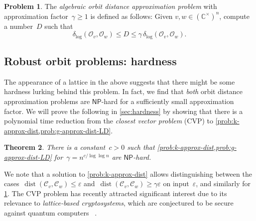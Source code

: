 \documentclass[10pt,a4paper]{article}
\newtheorem{theorem}{Theorem}[section]
\theoremstyle{definition}
\newtheorem{problem}[theorem]{Problem}\crefname{problem}{Problem}{Problems}
\DeclareMathOperator{\dist}{dist}
\newcommand{\distLD}{\delta_{\log}}
\newcommand{\CC}{\mathbb{C}}
\newcommand{\OO}{\ensuremath{\mathcal{O}}}
\newcommand{\KK}{\ensuremath{\mathcal{C}}}
\newcommand{\NP}{\ensuremath{\mathsf{NP}}\xspace}
\numberwithin{equation}{section}
\begin{document}
\begin{problem}%
\label{prob:g-approx-dist-LD}
The \emph{algebraic orbit distance approximation problem} with approximation factor~$\gamma\geq1$ is defined as follows:
Given $v,w\in (\CC^\times)^n$, compute a number~$D$ such that
\[
 \distLD(\OO_v,\OO_w) \le D \le \gamma \, \distLD(\OO_v,\OO_w).
\]
\end{problem}

\subsection{Robust orbit problems: hardness}\label{subsec:intro hardness}
The appearance of a lattice in the above suggests that there might be some hardness lurking behind this problem.
In fact, we find that \emph{both} orbit distance approximation problems are \NP-hard for a sufficiently small approximation factor.
We will prove the following in \cref{sec:hardness} by showing that there is a polynomial time reduction from the \textit{closest vector problem} (CVP) to \cref{prob:k-approx-dist,prob:g-approx-dist-LD}.

\begin{theorem}\label{thm:intro-orbit-hardness}
There is a constant~$c>0$ such that \cref{prob:k-approx-dist,prob:g-approx-dist-LD}
for~$\gamma = n^{c/\log\log n}$ are \NP-hard.
\end{theorem}

We note that a solution to \cref{prob:k-approx-dist} allows distinguishing between
the cases~$\dist(\KK_v,\KK_w)\leq\varepsilon$
and~$\dist(\KK_v,\KK_w)\geq \gamma\varepsilon$ on input~$\varepsilon$,
and similarly for \cref{prob:g-approx-dist-LD}.
The CVP problem has recently attracted significant interest due to its relevance to \emph{lattice-based cryptosystems},
which are conjectured to be secure against quantum computers%
~\cite{ggh-crypto, ntru-crytpo-1, ntru-crypto-2, homomorphic-crypto}.
\end{document}
